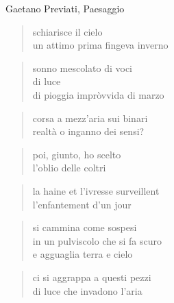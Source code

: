 \begin{volumetitlepage}
\end{volumetitlepage}


\begin{artItem}
	Gaetano Previati, Paesaggio
\end{artItem}

	\begin{verse}
		schiarisce il cielo\\
		un attimo prima fingeva inverno
	\end{verse}

\clearpage


	\begin{verse}
		sonno mescolato di voci\\
		di luce\\
		di pioggia impròvvida di marzo
	\end{verse}

	\begin{verse}
		corsa a mezz’aria sui binari\\
		realtà o inganno dei sensi?
	\end{verse}

	\begin{verse}
		poi, giunto, ho scelto\\
		l’oblio delle coltri
	\end{verse}

\clearpage


	\begin{otherlanguage}{french}
		\begin{verse}
			la haine et l’ivresse surveillent\\
			l’enfantement d’un jour
		\end{verse}
	\end{otherlanguage}

\clearpage


	\begin{verse}
		si cammina come sospesi\\
		in un pulviscolo che si fa scuro\\
		e agguaglia terra e cielo
	\end{verse}

	\begin{verse}
		ci si aggrappa a questi pezzi\\
		di luce che invadono l’aria
	\end{verse}

